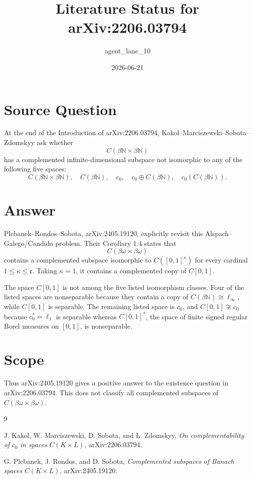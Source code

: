 \documentclass[11pt]{amsart}
\title{Literature Status for arXiv:2206.03794}
\author{agent\_lane\_10}
\date{2026-06-21}
\begin{document}
\maketitle

\section*{Source Question}

At the end of the Introduction of arXiv:2206.03794, Kakol--Marciszewski--Sobota--Zdomskyy ask whether
\[
        C(\beta\mathbb N\times\beta\mathbb N)
\]
has a complemented infinite-dimensional subspace not isomorphic to any of the
following five spaces:
\[
C(\beta\mathbb N\times\beta\mathbb N),\quad
C(\beta\mathbb N),\quad c_0,\quad
c_0\oplus C(\beta\mathbb N),\quad c_0(C(\beta\mathbb N)).
\]

\section*{Answer}

Plebanek--Rondos--Sobota, arXiv:2405.19120, explicitly revisit this
Alspach--Galego/Candido problem. Their Corollary 1.4 states that
\[
        C(\beta\omega\times\beta\omega)
\]
contains a complemented subspace isomorphic to \(C([0,1]^\kappa)\) for every
cardinal \(1\le \kappa\le\mathfrak c\). Taking \(\kappa=1\), it contains a
complemented copy of \(C[0,1]\).

The space \(C[0,1]\) is not among the five listed isomorphism classes. Four of
the listed spaces are nonseparable because they contain a copy of
\(C(\beta\mathbb N)\cong\ell_\infty\), while \(C[0,1]\) is separable. The
remaining listed space is \(c_0\), and \(C[0,1]\not\cong c_0\) because
\(c_0^*=\ell_1\) is separable whereas \(C[0,1]^*\), the space of finite signed
regular Borel measures on \([0,1]\), is nonseparable.

\section*{Scope}

Thus arXiv:2405.19120 gives a positive answer to the existence question in
arXiv:2206.03794. This does not classify all complemented subspaces of
\(C(\beta\omega\times\beta\omega)\).

\begin{thebibliography}{9}

J. Kakol, W. Marciszewski, D. Sobota, and L. Zdomskyy,
\emph{On complementability of \(c_0\) in spaces \(C(K\times L)\)},
arXiv:2206.03794.

G. Plebanek, J. Rondos, and D. Sobota,
\emph{Complemented subspaces of Banach spaces \(C(K\times L)\)},
arXiv:2405.19120.

\end{thebibliography}
\end{document}
